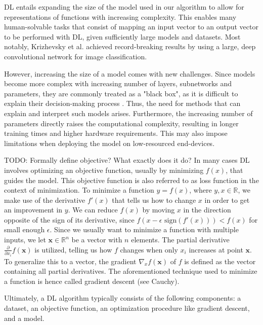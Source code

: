 DL entails expanding the size of the model used in our algorithm to allow for representations of functions with increasing complexity. This enables many human-solvable tasks that consist of mapping an input vector to an output vector to be performed with DL, given sufficiently large models and datasets. Most notably, Krizhevsky et al. \cite{krizhevsky2012imagenet} achieved record-breaking results by using a large, deep convolutional network for image classification.

However, increasing the size of a model comes with new challenges. Since models become more complex with increasing number of layers, subnetworks and parameters, they are commonly treated as a "black box", as it is difficult to explain their decision-making process \cite{noor2024survey}. Thus, the need for methods that can explain and interpret such models arises. Furthermore, the increasing number of parameters directly raises the computational complexity, resulting in longer training times and higher hardware requirements. This may also impose limitations when deploying the model on low-resourced end-devices.

TODO: Formally define objective? What exactly does it do?
In many cases DL involves optimizing an objective function, usually by minimizing $f(x)$, that guides the model. This objective function is also referred to as loss function in the context of minimization. %
To minimize a function $y = f(x)$, where $y,x \in \mathbb{R}$, we make use of the derivative $f'(x)$ that tells us how to change $x$ in order to get an improvement in $y$. We can reduce $f(x)$ by moving $x$ in the direction opposite of the sign of its derivative, since $f(x-\epsilon \text{ sign}(f'(x))) < f(x)$ for small enough $\epsilon$. Since we usually want to minimize a function with multiple inputs, we let $\mathbf{x} \in \mathbb{R}^n$ be a vector with $n$ elements. The partial derivative $\frac{\partial}{\partial x_i}f(\mathbf{x})$ is utilized, telling us how $f$ changes when only $x_i$ increases at point $\mathbf{x}$. To generalize this to a vector, the gradient $\nabla_xf(\mathbf{x})$ of $f$ is defined as the vector containing all partial derivatives. The aforementioned technique used to minimize a function is hence called gradient descent (see Cauchy\cite{cauchy1847methode}).

Ultimately, a DL algorithm typically consists of the following components: a dataset, an objective function, an optimization procedure like gradient descent, and a model. \bigskip%

